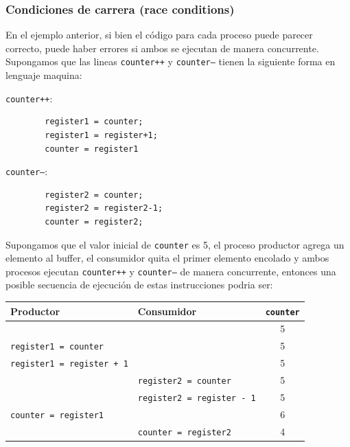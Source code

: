 \subsubsection{Condiciones de carrera (race conditions)}
En el ejemplo anterior, si bien el código para cada proceso puede parecer correcto, puede haber errores si ambos se ejecutan de manera concurrente. Supongamos que las lineas \texttt{counter++} y \texttt{counter--} tienen la siguiente forma en lenguaje maquina:
\begin{center}
	\begin{minipage}{0.8\textwidth}
\begin{multicols}{2}
	\noindent\texttt{counter++}:
	\begin{verbatim}
		register1 = counter;
		register1 = register+1;
		counter = register1	
	\end{verbatim}
	
	\noindent\texttt{counter--}:
	\begin{verbatim}
		register2 = counter;
		register2 = register2-1;
		counter = register2;
	\end{verbatim}
\end{multicols}
\end{minipage}

\end{center}

Supongamos que el valor inicial de \texttt{counter} es 5, el proceso productor agrega un elemento al buffer, el consumidor quita el primer elemento encolado y ambos procesos ejecutan \texttt{counter++} y \texttt{counter--} de manera concurrente, entonces una posible secuencia de ejecución de estas instrucciones podria ser:

\begin{center}
\begin{tabularx}{0.8\textwidth}{|L{1.3}|L{1.3}|C{0.4}|}
	\hline 
	\textbf{Productor} & \textbf{Consumidor} & \textbf{\texttt{counter}} \\
	\hline
	& & 5 \\
	\hline
	\texttt{register1 = counter} & & 5 \\
	\hline
	\texttt{register1 = register + 1} &  & 5 \\
	\hline
	 & \texttt{register2 = counter}  & 5 \\
 	\hline
	 &  \texttt{register2 = register - 1} & 5 \\
  	\hline
	 \texttt{counter = register1} &  & 6 \\
   	\hline
	& \texttt{counter = register2} & 4 \\
	\hline
	\end{tabularx}
\end{center}

